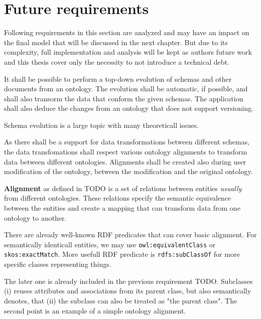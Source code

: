 \section{Future requirements}

Following requirements in this section are analyzed and may have an impact on the final model that will be discussed in the next chapter. But due to its complexity, full implementation and analysis will be kept as authors future work and this thesis cover only the necessity to not introduce a technical debt.

\begin{requirement}
    It shall be possible to perform a top-down evolution of schemas and other documents from an ontology. The evolution shall be automatic, if possible, and shall also transorm the data that conform the given schemas. The application shall also deduce the changes from an ontology that does not support versioning.
\end{requirement}

Schema evolution is a large topic with many theoreticall issues.




\begin{requirement}
    As there shall be a support for data transformations between different schemas, the data transfomations shall respect various ontology alignments to transform data between different ontologies. Alignments shall be created also during user modification of the ontology, between the modification and the original ontology.
\end{requirement}

\textbf{Alignment} as defined in TODO is a set of relations between entities \textit{usually} from different ontologies. These relations specify the semantic equivalence between the entities and create a mapping that can transform data from one ontology to another.

There are already well-known RDF predicates that can cover basic alignment. For semantically identicall entities, we may use \verb|owl:equivalentClass| or \verb|skos:exactMatch|. More usefull RDF predicate is \verb|rdfs:subClassOf| for more specific classes representing things.

The later one is already included in the previous requirement TODO. Subclasses (i) reuses attributes and associations from its parent class, but also semantically denotes, that (ii) the subclass can also be treated as "the parent class". The second point is an example of a simple ontology alignment.

\begin{showcase}
\end{showcase}
